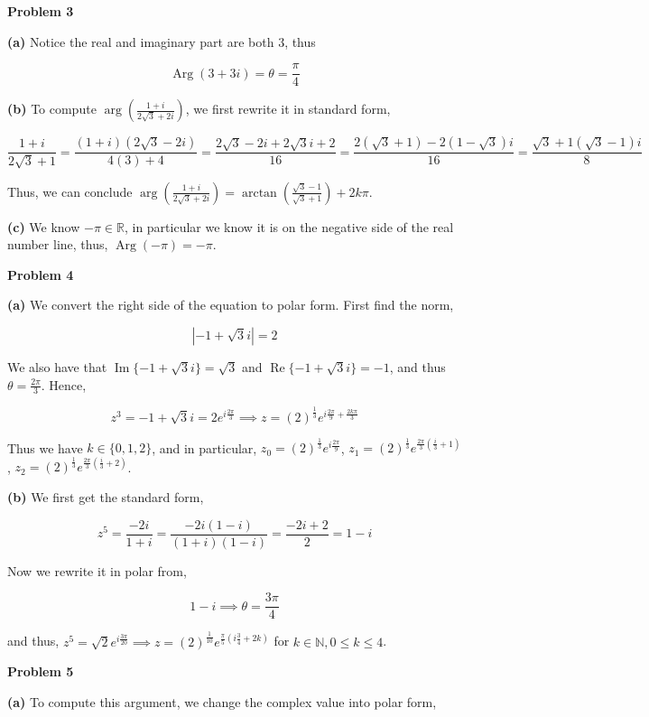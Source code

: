 \documentclass[12pt]{article}
\newcommand{\R}{\mathbb{R}}
\DeclareMathOperator{\Ima}{Im}
\DeclareMathOperator{\Rea}{Re}
\DeclareMathOperator{\Arg}{Arg}
\begin{document}
\textbf{Problem 3}

\textbf{(a)}
Notice the real and imaginary part are both $3$, thus

$$\Arg(3+3i) = \theta = \frac{\pi}{4}$$

\textbf{(b)}
To compute $\arg (\frac{1+i}{2\sqrt{3} + 2i})$, we first rewrite it in standard form,

$$\frac{1+i}{2\sqrt{3} + 1} = \frac{(1+i)(2\sqrt{3} -2i)}{4(3)+4} = \frac{2\sqrt{3}-2i+2\sqrt{3}i + 2}{16} = \frac{2(\sqrt{3} + 1) - 2(1-\sqrt{3})i}{16} = \frac{\sqrt{3}+1(\sqrt{3}-1)i}{8}$$

Thus, we can conclude $\arg (\frac{1+i}{2\sqrt{3} + 2i}) = \arctan (\frac{\sqrt{3}-1}{\sqrt{3}+1}) + 2k\pi$.

\textbf{(c)}
We know $-\pi \in \R$, in particular we know it is on the negative side of the real number line, thus, $\Arg (-\pi) = -\pi$.

\newpage

\textbf{Problem 4}

\textbf{(a)}
We convert the right side of the equation to polar form. First find the norm,

$$|-1+\sqrt{3}i| = 2$$

We also have that $\Ima \{-1+\sqrt{3}i \} = \sqrt{3}$ and $\Rea \{-1+\sqrt{3}i \} = -1$, and thus $\theta = \frac{2\pi}{3}$. Hence,

$$z^{3} = -1+\sqrt{3}i = 2e^{i\frac{2\pi}{3}} \implies z = (2)^{\frac{1}{3}}e^{i\frac{2\pi}{9} + \frac{2k\pi}{3}}$$

Thus we have $k \in \{0,1,2\}$, and in particular, $z_{0} = (2)^{\frac{1}{3}}e^{i\frac{2\pi}{9}}$, $z_{1} = (2)^{\frac{1}{3}}e^{\frac{2\pi}{3}(\frac{i}{3} + 1)}$, $z_{2} = (2)^{\frac{1}{3}}e^{\frac{2\pi}{3}(\frac{i}{3} + 2)}$.

\textbf{(b)}
We first get the standard form,

$$z^{5} = \frac{-2i}{1+i} = \frac{-2i(1-i)}{(1+i)(1-i)} = \frac{-2i+2}{2} = 1-i$$

Now we rewrite it in polar from,

$$1-i \implies \theta = \frac{3\pi}{4}$$

and thus, $z^{5} = \sqrt{2}e^{i\frac{3\pi}{20}} \implies z = (2)^{\frac{1}{10}}e^{\frac{\pi}{5}(i\frac{3}{4} + 2k)}$ for $k \in \mathbb{N} , 0 \leq k \leq 4$.

\textbf{Problem 5}

\textbf{(a)}
To compute this argument, we change the complex value into polar form,
\end{document}
